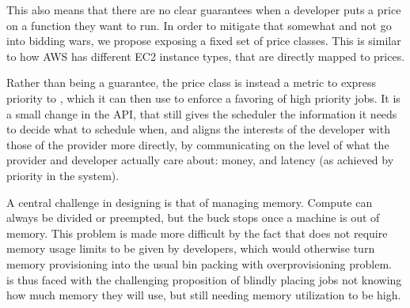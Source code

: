 This also means that there are no clear guarantees when a developer puts a price
on a function they want to run. In order to mitigate that somewhat and not go
into bidding wars, we propose exposing a fixed set of price classes. This is
similar to how AWS has different EC2 instance types, that are directly mapped to
prices. 

Rather than being a guarantee, the price class is instead a metric to express
priority to \sys{}, which it can then use to enforce a favoring of high priority
jobs. It is a small change in the API, that still gives the scheduler the
information it needs to decide what to schedule when, and aligns the interests
of the developer with those of the provider more directly, by communicating on
the level of what the provider and developer actually care about: money, and
latency (as achieved by priority in the system).

A central challenge in designing \sys{} is that of managing memory. Compute can
always be divided or preempted, but the buck stops once a machine is out of
memory. This problem is made more difficult by the fact that \sys{} does not
require memory usage limits to be given by developers, which would otherwise
turn memory provisioning into the usual bin packing with overprovisioning
problem.~\Sys{} is thus faced with the challenging proposition of blindly
placing jobs not knowing how much memory they will use, but still needing memory
utilization to be high.


 
